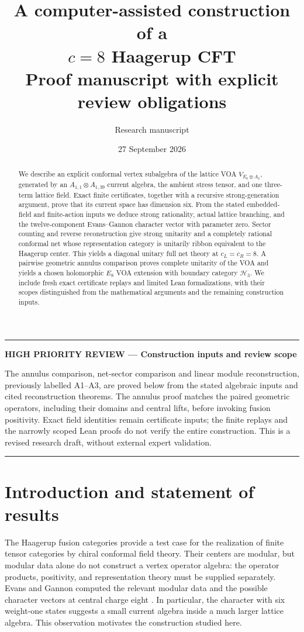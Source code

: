 \documentclass[11pt,a4paper]{article}
\title{A computer-assisted construction of a\\[3pt]
  \texorpdfstring{\(c=8\)}{c=8} Haagerup CFT\\[5pt]
  \large Proof manuscript with explicit review obligations}
\author{Research manuscript}
\date{27 September 2026}
\theoremstyle{definition}
\newcommand{\HH}{\mathcal H}
\newenvironment{criticalnote}[1]{\par\addvspace{8pt}\begingroup
  \color{BrickRed}\noindent\rule{\linewidth}{1pt}\par\nobreak
  \noindent\textbf{HIGH PRIORITY REVIEW --- #1}\par\nobreak\small\noindent\ignorespaces
}{\par\noindent\rule{\linewidth}{1pt}\par\endgroup\addvspace{8pt}}
\begin{document}
\maketitle
\begin{abstract}
We describe an explicit conformal vertex subalgebra of the lattice VOA
\(V_{E_6\oplus A_2}\), generated by an \(A_{1,1}\otimes A_{1,39}\)
current algebra, the ambient stress tensor, and one three-term lattice field.
Exact finite certificates, together with a recursive strong-generation
argument, prove that its current space has dimension six. From the
stated embedded-field and finite-action inputs we deduce strong
rationality, actual lattice branching, and the twelve-component
Evans--Gannon character vector with parameter zero. Sector counting and
reverse reconstruction give strong unitarity and a completely rational
conformal net whose representation category is unitarily ribbon
equivalent to the Haagerup center. This yields a diagonal unitary full
net theory at $c_L=c_R=8$. A pairwise geometric annulus comparison
proves complete unitarity of the VOA and yields a chosen holomorphic
$E_8$ VOA extension with boundary category $\HH_3$.
We include fresh exact certificate
replays and limited Lean formalizations, with their scopes distinguished
from the mathematical arguments and the remaining construction inputs.
\end{abstract}

\begin{criticalnote}{Construction inputs and review scope}
The annulus comparison, net-sector comparison and linear module
reconstruction, previously labelled A1--A3, are proved below from the
stated algebraic inputs and cited reconstruction theorems. The annulus
proof matches the paired geometric operators, including their domains
and central lifts, before invoking fusion positivity. Exact field
identities remain certificate inputs; the finite replays and the
narrowly scoped Lean proofs do not verify the entire construction.
This is a revised research draft, without external expert validation.
\end{criticalnote}

\clearpage
\tableofcontents
\clearpage

\section{Introduction and statement of results}
\label{sec:statement}

The Haagerup fusion categories provide a test case for the realization of
finite tensor categories by chiral conformal field theory. Their centers
are modular, but modular data alone do not construct a vertex operator
algebra: the operator products, positivity, and representation theory
must be supplied separately. Evans and Gannon computed the relevant
modular data and the possible character vectors at central charge eight
\cite[Sections 2.4 and 5]{EG}. In particular, the character with six
weight-one states suggests a small current algebra inside a much larger
lattice algebra. This observation motivates the construction studied here.
\end{document}
